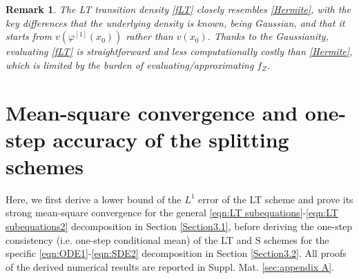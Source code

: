 \documentclass[a4paper,12pt]{article}
\numberwithin{equation}{section}
\theoremstyle{plain}
\newtheorem{remark}{Remark}
\theoremstyle{definition}
\begin{document}
\begin{remark}
The LT transition density \eqref{fLT} closely resembles \eqref{Hermite}, with the key differences that the underlying density is known, being Gaussian,  and that it starts from $v(\varphi^{[1]}(x_0))$ rather than $v(x_0)$. Thanks to the Gaussianity, evaluating \eqref{fLT} is straightforward and less computationally costly than \eqref{Hermite}, which is limited by the burden of evaluating/approximating $f_Z$.
\end{remark}
\section{Mean-square convergence and one-step accuracy of the splitting schemes}\label{sec:convergence}
{Here, we first derive a lower bound of the $L^1$ error of the LT scheme and prove its strong mean-square convergence for the 
general \eqref{eqn:LT subequations}-\eqref{eqn:LT subequations2} decomposition in Section \ref{Section3.1}, before deriving the one-step consistency (i.e. one-step conditional mean) of the LT and S schemes for the specific \eqref{eqn:ODE1}-\eqref{eqn:SDE2}  decomposition in Section \ref{Section3.2}. All proofs of the derived numerical results are reported in Suppl. Mat. \ref{sec:appendix A}.} 
\end{document}
